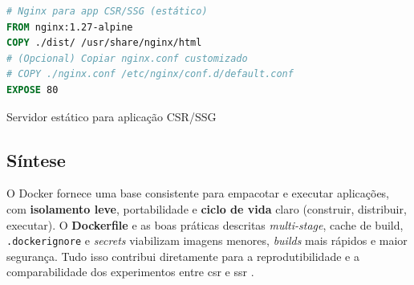 \begin{codigo}[H]
\begin{lstlisting}[language=Dockerfile]
# Nginx para app CSR/SSG (estático)
FROM nginx:1.27-alpine
COPY ./dist/ /usr/share/nginx/html
# (Opcional) Copiar nginx.conf customizado
# COPY ./nginx.conf /etc/nginx/conf.d/default.conf
EXPOSE 80
\end{lstlisting}
\caption{Servidor estático para aplicação CSR/SSG}
\label{lst:dockerfile-nginx-static}
\end{codigo}

\subsection{Síntese}
\label{sec:docker-sintese}

O Docker fornece uma base consistente para empacotar e executar aplicações, com \textbf{isolamento leve}, portabilidade e \textbf{ciclo de vida} claro (construir, distribuir, executar). O \textbf{Dockerfile} e as boas práticas descritas \textit{multi-stage}, cache de build, \texttt{.dockerignore} e \textit{secrets} viabilizam imagens menores, \textit{builds} mais rápidos e maior segurança. Tudo isso contribui diretamente para a reprodutibilidade e a comparabilidade dos experimentos entre \acrshort{csr} e \acrshort{ssr} \cite{docker_overview,dockerfile_ref}. 
